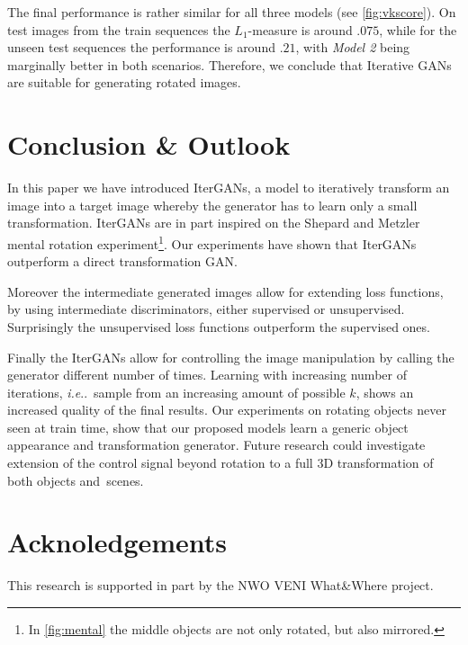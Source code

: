 \documentclass[runningheads]{llncs}
\makeatletter
\DeclareRobustCommand\onedot{\futurelet\@let@token\@onedot}
\def\@onedot{\ifx\@let@token.\else.\null\fi\xspace}
\def\ie{\emph{i.e}\onedot} \def\Ie{\emph{I.e}\onedot}
\let\wip\emph
\makeatother
\begin{document}
The final performance is rather similar for all three models (see \autoref{fig:vkscore}).
On test images from the train sequences the $L_1$-measure is around $.075$, while for the unseen test sequences the performance is around $.21$, with \wip{Model 2} being marginally better in both scenarios. 
Therefore, we conclude that Iterative GANs are suitable for generating rotated images.



\vspace{-3mm}
\section{Conclusion \& Outlook}
\label{sec:conc}
\vspace{-3mm}
In this paper we have introduced IterGANs, a model to iteratively transform an image into a target image whereby the generator has to learn only a small transformation.
IterGANs are in part inspired on the Shepard and Metzler\cite{shepard1971mental} mental rotation experiment\footnote{In \autoref{fig:mental} the middle objects are not only rotated, but also mirrored.}. Our experiments have shown that IterGANs outperform a direct transformation GAN.

Moreover the intermediate generated images allow for extending loss functions, by using intermediate discriminators, either supervised or unsupervised.
Surprisingly the unsupervised loss functions outperform the supervised ones.

Finally the IterGANs allow for controlling the image manipulation by calling the generator different number of times.
Learning with increasing number of iterations, \ie~sample from an increasing amount of possible $k$, shows an increased quality of the final results.
Our experiments on rotating objects never seen at train time, show that our proposed models learn a generic object appearance and transformation generator. 
Future research could investigate extension of the control signal beyond rotation to a full 3D transformation of both objects and~scenes.

\section*{Acknoledgements}
\vspace{-3mm}
This research is supported in part by the NWO VENI What\&Where project.

\clearpage


\end{document}
